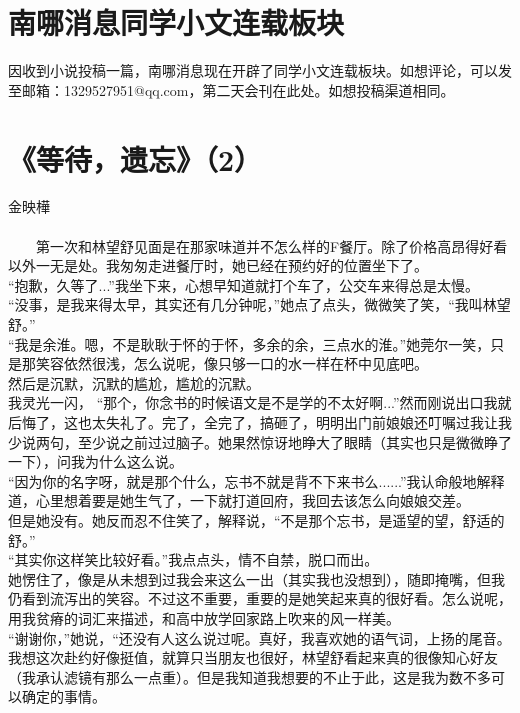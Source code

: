 \documentclass[letterpaper, 12pt]{article}
\begin{document}
\begin{multicols}{2}
\section{南哪消息同学小文连载板块}
因收到小说投稿一篇，南哪消息现在开辟了同学小文连载板块。如想评论，可以发至邮箱：1329527951@qq.com，第二天会刊在此处。如想投稿渠道相同。
\section{《等待，遗忘》（2）}
金映樺\\
\fan
\\
　　第一次和林望舒见面是在那家味道并不怎么样的F餐厅。除了价格高昂得好看以外一无是处。我匆匆走进餐厅时，她已经在预约好的位置坐下了。\\
  
“抱歉，久等了...”我坐下来，心想早知道就打个车了，公交车来得总是太慢。\\
“没事，是我来得太早，其实还有几分钟呢，”她点了点头，微微笑了笑，“我叫林望舒。”\\
“我是余淮。嗯，不是耿耿于怀的于怀，多余的余，三点水的淮。”她莞尔一笑，只是那笑容依然很浅，怎么说呢，像只够一口的水一样在杯中见底吧。\\

然后是沉默，沉默的尴尬，尴尬的沉默。\\

我灵光一闪， “那个，你念书的时候语文是不是学的不太好啊...”然而刚说出口我就后悔了，这也太失礼了。完了，全完了，搞砸了，明明出门前娘娘还叮嘱过我让我少说两句，至少说之前过过脑子。她果然惊讶地睁大了眼睛（其实也只是微微睁了一下），问我为什么这么说。\\

“因为你的名字呀，就是那个什么，忘书不就是背不下来书么......”我认命般地解释道，心里想着要是她生气了，一下就打道回府，我回去该怎么向娘娘交差。\\

但是她没有。她反而忍不住笑了，解释说，“不是那个忘书，是遥望的望，舒适的舒。”\\

“其实你这样笑比较好看。”我点点头，情不自禁，脱口而出。\\

她愣住了，像是从未想到过我会来这么一出（其实我也没想到），随即掩嘴，但我仍看到流泻出的笑容。不过这不重要，重要的是她笑起来真的很好看。怎么说呢，用我贫瘠的词汇来描述，和高中放学回家路上吹来的风一样美。\\

“谢谢你，”她说，“还没有人这么说过呢。真好，我喜欢她的语气词，上扬的尾音。我想这次赴约好像挺值，就算只当朋友也很好，林望舒看起来真的很像知心好友（我承认滤镜有那么一点重）。但是我知道我想要的不止于此，这是我为数不多可以确定的事情。\\


\end{multicols}
\end{document}
